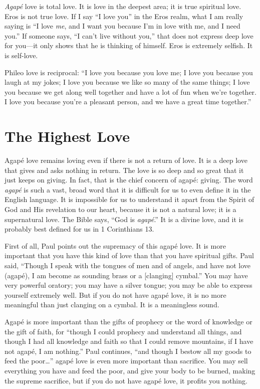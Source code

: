 \emph{Agapé} love is total love. It is love in the deepest area; it is 
true spiritual love. Eros is not true love. If I say “I love you” 
in the Eros realm, what I am really saying is “I love \emph{me}, and 
I want you because I’m in love with me, and I need you.” 
If someone says, “I can’t live without you,” that does not 
express deep love for you—it only shows that he is thinking 
of himself. Eros is extremely selfish. It is self-love.

Phileo love is reciprocal: “I love you because you love 
me; I love you because you laugh at my jokes; I love you 
because we like so many of the same things; I love you 
because we get along well together and have a lot of fun 
when we’re together. I love you because you’re a pleasant 
person, and we have a great time together.”


\section*{The Highest Love}

Agapé love remains loving even if there is not a return 
of love. It is a deep love that gives and asks nothing in 
return. The love is so deep and so great that it just keeps on 
giving. In fact, that is the chief concern of agapé: giving. The 
word \emph{agapé} is such a vast, broad word that it is difficult for 
us to even define it in the English language. It is impossible 
for us to understand it apart from the Spirit of God and His 
revelation to our heart, because it is not a natural love; it is 
a supernatural love. The Bible says, “God is \emph{agapé}.” It is a 
divine love, and it is probably best defined for us in 1 Corinthians 13.

First of all, Paul points out the supremacy of this agapé 
love. It is more important that you have this kind of love 
than that you have spiritual gifts. Paul said, “Though I 
speak with the tongues of men and of angels, and have not 
love (agapé), I am become as sounding brass or a [clanging] cymbal.” You may have very powerful oratory; you
may have a silver tongue; you may be able to express yourself extremely well. But if you do not have agapé love, it is 
no more meaningful than just clanging on a cymbal. It is a 
meaningless sound.

Agapé is more important than the gifts of prophecy or 
the word of knowledge or the gift of faith, for “though I 
could prophecy and understand all things, and though I 
had all knowledge and faith so that I could remove mountains, if I have not agapé, I am nothing.” Paul continues, 
“and though I bestow all my goods to feed the poor…” 
agapé love is even more important than sacrifice. You may 
sell everything you have and feed the poor, and give your 
body to be burned, making the supreme sacrifice, but if you 
do not have agapé love, it profits you nothing.

